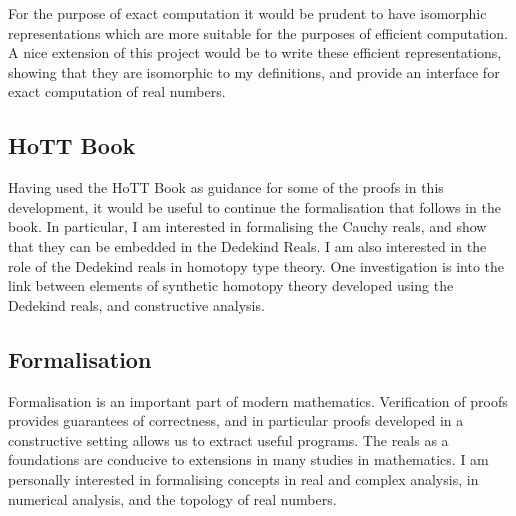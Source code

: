 \documentclass[ProjectReport]{subfiles}
\begin{document}
For the purpose of exact computation it would be prudent to have isomorphic representations which are more suitable for the purposes of efficient computation. A nice extension of this project would be to write these efficient representations, showing that they are isomorphic to my definitions, and provide an interface for exact computation of real numbers. 

\subsection{HoTT Book}

Having used the HoTT Book as guidance for some of the proofs in this development, it would be useful to continue the formalisation that follows in the book. In particular, I am interested in formalising the Cauchy reals, and show that they can be embedded in the Dedekind Reals. I am also interested in the role of the Dedekind reals in homotopy type theory. One investigation is into the link between elements of synthetic homotopy theory developed using the Dedekind reals, and constructive analysis. 

\subsection{Formalisation}

Formalisation is an important part of modern mathematics. Verification of proofs provides guarantees of correctness, and in particular proofs developed in a constructive setting allows us to extract useful programs. The reals as a foundations are conducive to extensions in many studies in mathematics. I am personally interested in formalising concepts in real and complex analysis, in numerical analysis, and the topology of real numbers. 
\end{document}

